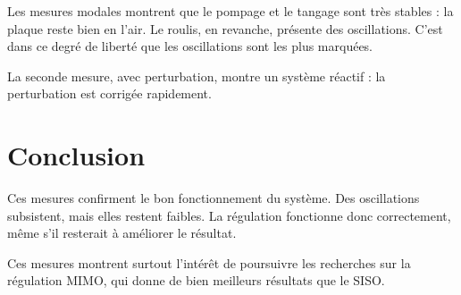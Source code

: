 Les mesures modales montrent que le pompage et le tangage sont très stables : la plaque reste bien en l'air. Le roulis, en revanche, présente des oscillations. C'est dans ce degré de liberté que les oscillations sont les plus marquées.

La seconde mesure, avec perturbation, montre un système réactif : la perturbation est corrigée rapidement.

\section{Conclusion}
Ces mesures confirment le bon fonctionnement du système. Des oscillations subsistent, mais elles restent faibles. La régulation fonctionne donc correctement, même s'il resterait à améliorer le résultat.

Ces mesures montrent surtout l'intérêt de poursuivre les recherches sur la régulation MIMO, qui donne de bien meilleurs résultats que le SISO.
